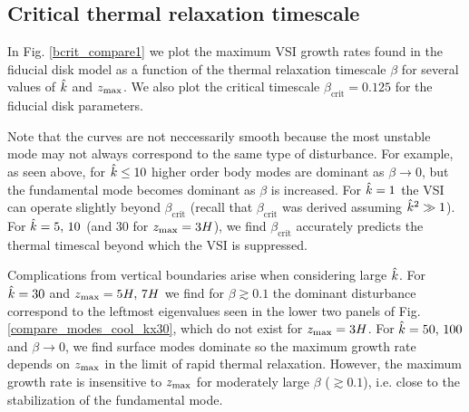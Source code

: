 


\subsection{Critical thermal relaxation
  timescale}\label{bcrit_num_test}
In Fig. \ref{bcrit_compare1} we plot the maximum VSI growth rates
found in the fiducial disk model as a function of the thermal
relaxation timescale $\beta$ for several values of $\hat{k}$ and
$z_\mathrm{max}$. We also plot the critical timescale
$\beta_\mathrm{crit}=0.125$ for the fiducial disk parameters.   

Note that the curves are not neccessarily smooth because the most unstable
mode may not always correspond to the same type of disturbance. For example,
as seen above, for $\hat{k} \leq 10$ higher order body modes are
dominant as $\beta\to 0$, but the fundamental 
mode becomes dominant as $\beta$ is increased. For $\hat{k}=1$ the VSI
can operate slightly beyond $\beta_\mathrm{crit}$  (recall that
$\beta_\mathrm{crit}$ was derived assuming $\hat{k}^2\gg 1$). For
$\hat{k}=5,\,10$ (and $30$ for $z_\mathrm{max}=3H$), we find
$\beta_\mathrm{crit}$ accurately predicts the thermal timescal beyond
which the VSI is suppressed.   

Complications from vertical boundaries arise when considering large
$\hat{k}$. For $\hat{k}=30$ and $z_\mathrm{max}=5H,\,7H$ we find for $\beta\gtrsim
0.1$ the dominant disturbance correspond to the leftmost eigenvalues 
seen in the lower two panels of Fig. \ref{compare_modes_cool_kx30},
which do not exist for $z_\mathrm{max}=3H$. For $\hat{k}=50,\,100$ and
$\beta\to0$, we find surface modes dominate so the maximum growth rate
depends on $z_\mathrm{max}$ in the limit of rapid thermal relaxation. 
However, the maximum growth rate is insensitive to 
$z_\mathrm{max}$ for moderately large $\beta$ ($\gtrsim 0.1$), i.e. close to
the stabilization of the fundamental mode.  

